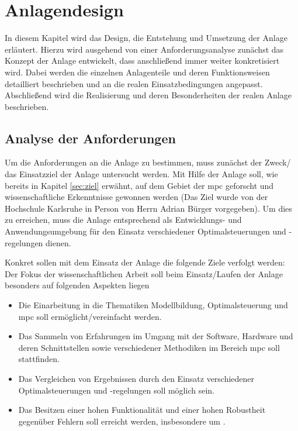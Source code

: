 %
%

\chapter{Anlagendesign}
\label{chap:anlagendesign}

\renewcommand{\chapterheadstartvskip}{\vspace*{-0.5cm}}

In diesem Kapitel wird das Design, die Entstehung und Umsetzung der Anlage erläutert. Hierzu wird ausgehend von einer Anforderungsanalyse zunächst das Konzept der Anlage entwickelt, dass anschließend immer weiter konkretisiert wird. Dabei werden die einzelnen Anlagenteile und deren Funktionsweisen detailliert beschrieben und an die realen Einsatzbedingungen angepasst. Abschließend wird die Realisierung und deren Besonderheiten der realen Anlage beschrieben.

\section{Analyse der Anforderungen}
\label{sec:anforderungen}
Um die Anforderungen an die Anlage zu bestimmen, muss zunächst der Zweck/ das Einsatzziel der Anlage untersucht werden. Mit Hilfe der Anlage soll, wie bereits in Kapitel \ref{sec:ziel} erwähnt, auf dem Gebiet der \acrlong{mpc} geforscht und wissenschaftliche Erkenntnisse gewonnen werden (Das Ziel wurde von der Hochschule Karlsruhe in Person von Herrn Adrian Bürger vorgegeben). Um dies zu erreichen, muss die Anlage entsprechend als Entwicklungs- und Anwendungsumgebung für den Einsatz verschiedener Optimalsteuerungen und -regelungen dienen.

Konkret sollen mit dem Einsatz der Anlage die folgende Ziele verfolgt werden:
Der Fokus der wissenschaftlichen Arbeit soll beim Einsatz/Laufen der Anlage besonders auf folgenden Aspekten liegen
\begin{itemize}
	\item Die Einarbeitung in die Thematiken Modellbildung, Optimalsteuerung und \acrlong{mpc} soll ermöglicht/vereinfacht werden.
	\item Das Sammeln von Erfahrungen im Umgang mit der Software, Hardware und deren Schnittstellen sowie verschiedener Methodiken im Bereich \acrlong{mpc} soll stattfinden.
	\item Das Vergleichen von Ergebnissen durch den Einsatz verschiedener Optimalsteuerungen und -regelungen soll möglich sein.
	\item Das Besitzen einer hohen Funktionalität und einer hohen Robustheit gegenüber Fehlern soll erreicht werden, insbesondere um .
\end{itemize}

